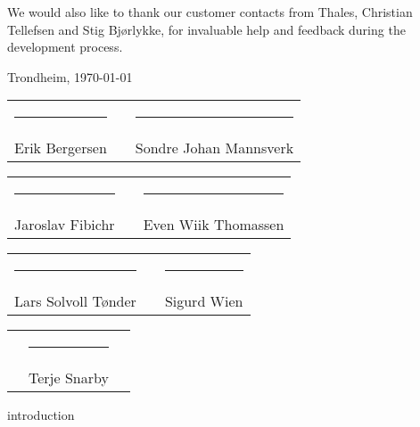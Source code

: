 \documentclass[a4paper, 11pt]{report}
\begin{document}
We would also like to thank our customer contacts from Thales, Christian
Tellefsen and Stig Bjørlykke, for invaluable help and feedback during the
development process.

\begin{center}
    Trondheim, \today
\end{center}
\vspace{0.75cm}

\noindent
\begin{tabular}{lcl}
    \rule{5cm}{1pt} & \hspace{2cm} & \rule{5cm}{1pt} \\
    Erik Bergersen & & Sondre Johan Mannsverk
\end{tabular}
\vspace{0.75cm}

\noindent
\begin{tabular}{lcl}
    \rule{5cm}{1pt} & \hspace{2cm} & \rule{5cm}{1pt} \\
    Jaroslav Fibichr & & Even Wiik Thomassen
\end{tabular}
\vspace{0.75cm}

\noindent
\begin{tabular}{lcl}
    \rule{5cm}{1pt} & \hspace{2cm} & \rule{5cm}{1pt} \\
    Lars Solvoll Tønder & & Sigurd Wien
\end{tabular}
\vspace{0.75cm}

\noindent
\begin{tabular}{lcl}
    \hspace{3.5cm} & \rule{5cm}{1pt} & \hspace{3.5cm} \\
    & Terje Snarby & 
\end{tabular}

\clearpage
{}
{}
 {introduction}

\clearpage
{}
{}
\tableofcontents

\clearpage
{}
{}
\listoffigures

\clearpage
{}
{}
\listoftables
\end{document}
